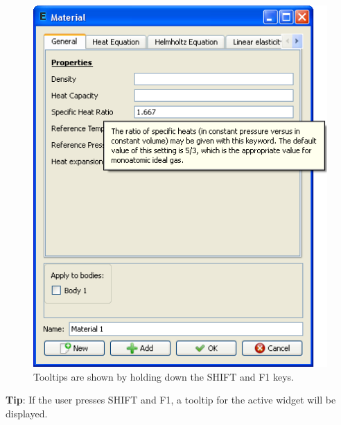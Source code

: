 \documentclass[a4paper,12pt]{article}
\begin{document}
\begin{figure}[ht]
\begin{center}
 \includegraphics[scale=0.5]{images/tooltip.png}
\caption{Tooltips are shown by holding down the SHIFT and F1 keys.}
\end{center}
\end{figure}

{\bf Tip}: If the user presses SHIFT and F1, a tooltip for the active widget will be displayed.
\end{document}
